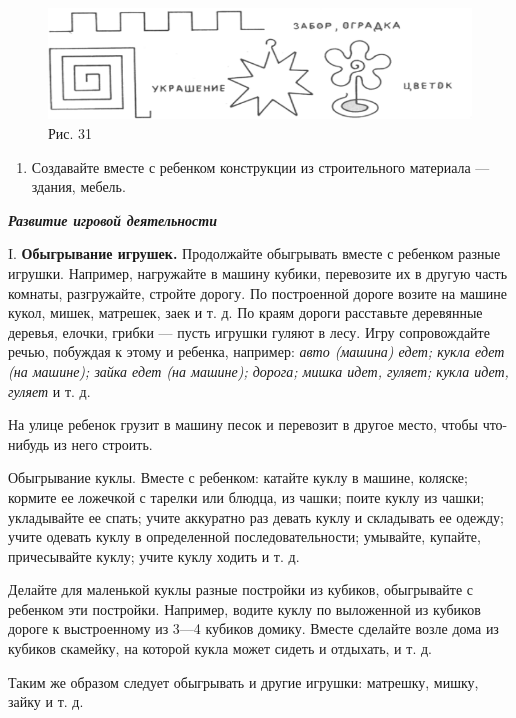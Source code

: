 \documentclass{book}
\renewcommand{\emph}[1]{\textit{#1}}
\begin{document}
\begin{figure}
\centering
\includegraphics[width=\linewidth]{media/media/image28.png}
\caption*{Рис. 31}
\end{figure}


\begin{enumerate}
\def\labelenumi{\arabic{enumi}.}
\setcounter{enumi}{7}
\item
  
  Создавайте вместе с ребенком конструкции из строительного материала
  --- здания, мебель.
  
\end{enumerate}


\emph{\textbf{Развитие игровой деятельности}}

I. \textbf{Обыгрывание игрушек.} Продолжайте обыгрывать вместе с
ребенком разные игрушки. Например, нагружайте в машину кубики,
перевозите их в другую часть комнаты, разгружайте, стройте дорогу. По
построенной дороге возите на машине кукол, мишек, матрешек, заек и т. д.
По краям дороги расставьте деревянные деревья, елочки, грибки --- пусть
игрушки гуляют в лесу. Игру сопровождайте речью, побуждая к этому и
ребенка, например: \emph{авто (машина) едет; кукла едет (на машине);
зайка едет (на машине); дорога; мишка идет, гуляет; кукла идет, гуляет}
и т. д.

На улице ребенок грузит в машину песок и перевозит в другое место, чтобы
что-нибудь из него строить.

Обыгрывание куклы. Вместе с ребенком: катайте куклу в машине, коляске;
кормите ее ложечкой с тарелки или блюдца, из чашки; поите куклу из
чашки; укладывайте ее спать; учите аккуратно раз девать куклу и
складывать ее одежду; учите одевать куклу в определенной
последовательности; умывайте, купайте, причесывайте куклу; учите куклу
ходить и т. д.

Делайте для маленькой куклы разные постройки из кубиков, обыгрывайте с
ребенком эти постройки. Например, водите куклу по выложенной из кубиков
дороге к выстроенному из 3---4 кубиков домику. Вместе сделайте возле
дома из кубиков скамейку, на которой кукла может сидеть и отдыхать, и т.
д.

Таким же образом следует обыгрывать и другие игрушки: матрешку, мишку,
зайку и т. д.
\end{document}
